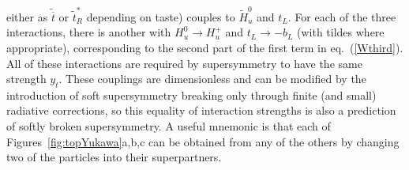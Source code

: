 \documentclass[12pt]{article}
\def\sbar{\overline}
\def\stilde{\widetilde}
\begin{document}
either as $\stilde {\sbar t}$ or $\stilde t_R^*$ depending on taste)
couples to ${\stilde H}^0_u$ and $t_L$. For each of the three
interactions, there is another with $H_u^0\rightarrow H_u^+$ and $t_L
\rightarrow -b_L$ (with tildes where appropriate), corresponding to the
second part of the first term in eq.~(\ref{Wthird}). All of these
interactions are required by supersymmetry to have the same strength
$y_t$. These couplings are dimensionless and can be modified by the
introduction of soft supersymmetry breaking only through finite (and
small) radiative corrections, so this equality of interaction strengths is
also a prediction of softly broken supersymmetry. A useful mnemonic is
that each of Figures~{\ref{fig:topYukawa}}a,b,c can be obtained from any
of the others by changing two of the particles into their superpartners. 
\end{document}
